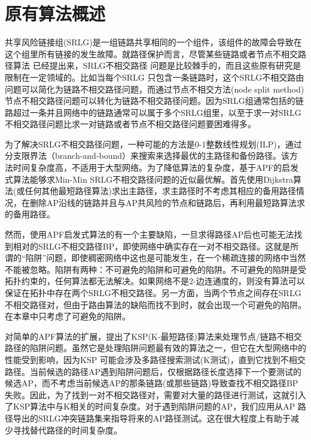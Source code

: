 \section{原有算法概述}
共享风险链接组(SRLG)是一组链路共享相同的一个组件，该组件的故障会导致在这个组里所有链接的发生故障。就路径保护而言，尽管某些链路或者节点不相交路径算法\cite{suurballe1984quick,bhandari1997optimal,li1990complexity,guo2003link,xu2004finding,beshir2011variants,guo2013finding,hu2003diverse} 已经提出来，SRLG不相交路径 问题是比较棘手的，而且这些原有研究是限制在一定领域的。比如当每个SRLG 只包含一条链路时，这个SRLG不相交路由问题可以简化为链路不相交路径问题，而通过节点不相交方法(node split method)\cite{ford2015flows}节点不相交路径问题可以转化为链路不相交路径问题。因为SRLG组通常包括的链路超过一条并且网络中的链路通常可以属于多个SRLG组里，以至于求一对SRLG 不相交路径问题比求一对链路或者节点不相交路径问题要困难得多。

为了解决SRLG不相交路径问题，一种可能的方法是0-1整数线性规划(ILP)\cite{hu2003diverse}，通过分支限界法（branch-and-bound）来搜索来选择最优的主路径和备份路径。该方法时间复杂度高，不适用于大型网络。为了降低算法的复杂度，基于APF的启发式算法\cite{oki2002disjoint,li2002fiber,eppstein1998finding}能够求Min-Min SRLG不相交路径问题的近似最优解。首先使用Dijkstra算法(或任何其他最短路径算法)求出主路径，求主路径时不考虑其相应的备用路径情况，在删除AP沿线的链路并且与AP共风险的节点和链路后，再利用最短路算法求的备用路径。

然而，使用APF启发式算法的有一个主要缺陷，一旦求得路径AP后也可能无法找到相对的SRLG不相交路径BP，即使网络中确实存在一对不相交路径。这就是所谓的“陷阱”问题，即使稠密网络中\cite{laborczi2001solving}这也是可能发生，在一个稀疏连接的网络中当然不能被忽略。陷阱有两种：不可避免的陷阱和可避免的陷阱。不可避免的陷阱是受拓扑约束的，任何算法都无法解决。如果网络不是2-边连通度的，则没有算法可以保证在拓扑中存在两个SRLG不相交路径。另一方面，当两个节点之间存在SRLG不相交路径对，但由于路由算法的缺陷而找不到时，就会出现一个可避免的陷阱。在本章中只考虑了可避免的陷阱。

对简单的APF算法的扩展，提出了KSP(K-最短路径)算法来处理节点/链路不相交路径的陷阱问题。虽然它是处理陷阱问题最有效的算法之一，但它在大型网络中的性能受到影响，因为KSP 可能会涉及多路径搜索测试(K测试)，直到它找到不相交路径。当前候选的路径AP遇到陷阱问题后，仅根据路径长度选择下一个要测试的候选AP，而不考虑当前候选AP的那条链路(或那些链路)导致查找不相交路径BP失败。因此，为了找到一对不相交路径对，需要对大量的路径进行测试，这就引入了KSP算法中与K相关的时间复杂度。对于遇到陷阱问题的AP，我们应用从AP 路径导出的SRLG冲突链路集来指导将来的AP路径测试。这在很大程度上有助于减少寻找替代路径的时间复杂度。


